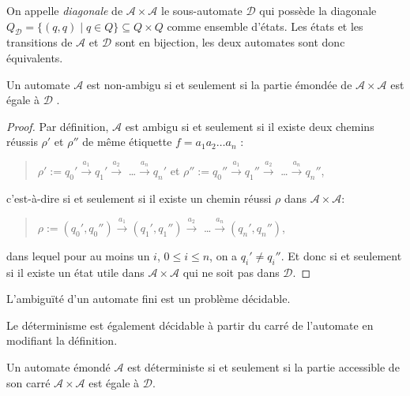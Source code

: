 	On appelle \emph{diagonale} de $\mathscr{A}\times \mathscr{A}$ le sous-automate $\mathscr{D}$ qui possède la diagonale $Q_\mathscr{D} = \{(q,q) \mid q \in Q\} \subseteq Q \times Q$ comme ensemble d'états. Les états et les transitions de $\mathscr{A}$ et $\mathscr{D}$ sont en bijection, les deux automates sont donc équivalents. \\
	
	\begin{lemma}
		Un automate $\mathscr{A}$ est non-ambigu si et seulement si la partie émondée de $\mathscr{A} \times \mathscr{A}$ est égale à $\mathscr{D}$ .
	\end{lemma}
	
	\begin{proof}
		Par définition, $\mathscr{A}$ est ambigu si et seulement si il existe deux chemins réussis $\rho'$ et $\rho''$ de même étiquette $f = a_1a_2\ldots a_n$ : 
		
		\begin{quotation}
		$\rho' := q_0' \xrightarrow{a_1} q_1' \xrightarrow{a_2}$ \ldots $\xrightarrow{a_n} q_n'$ et $\rho'' := q_0'' \xrightarrow{a_1} q_1'' \xrightarrow{a_2}$ \ldots $\xrightarrow{a_n} q_n''$,
		\end{quotation}
		
		c'est-à-dire si et seulement si il existe un chemin réussi $\rho$ dans $\mathscr{A} \times \mathscr{A}$:
		
		\begin{quotation}
		$\rho := (q_0', q_0'') \xrightarrow{a_1} (q_1', q_1'') \xrightarrow{a_2}$ \ldots $\xrightarrow{a_n} (q_n', q_n'')$,
		\end{quotation}
		
		dans lequel pour au moins un $i$, $0 \leq i \leq n$, on a $q_i' \neq q_i''$. Et donc si et seulement si il existe un état utile dans $\mathscr{A} \times \mathscr{A}$ qui ne soit pas dans $\mathscr{D}$.
	\end{proof}
	
	\begin{proposition}
		L'ambiguïté d'un automate fini est un problème décidable.
	\end{proposition}
	
	Le déterminisme est également décidable à partir du carré de l'automate en modifiant la définition. \\
	
	\begin{lemma}
		Un automate émondé $\mathscr{A}$ est déterministe si et seulement si la partie accessible de son carré $\mathscr{A} \times \mathscr{A}$ est égale à $\mathscr{D}$.
	\end{lemma}
	
